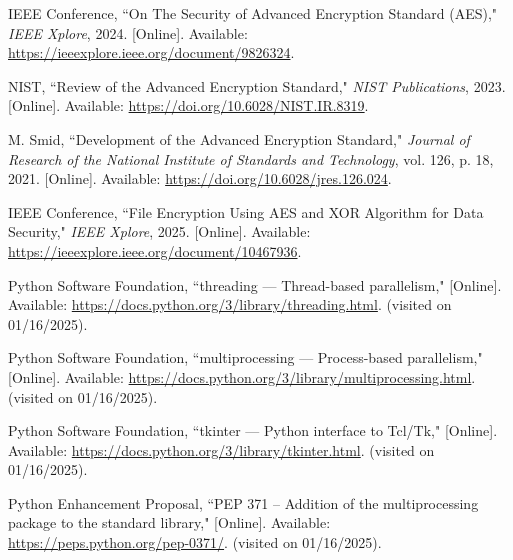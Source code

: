 \documentclass[../DoAn.tex]{subfiles}
\begin{document}
\cite{AES2024security} IEEE Conference, ``On The Security of Advanced Encryption Standard (AES)," \textit{IEEE Xplore}, 2024. [Online]. Available: \url{https://ieeexplore.ieee.org/document/9826324}.

\cite{AESReview} NIST, ``Review of the Advanced Encryption Standard," \textit{NIST Publications}, 2023. [Online]. Available: \url{https://doi.org/10.6028/NIST.IR.8319}.

\cite{AESDevelopment} M. Smid, ``Development of the Advanced Encryption Standard," \textit{Journal of Research of the National Institute of Standards and Technology}, vol. 126, p. 18, 2021. [Online]. Available: \url{https://doi.org/10.6028/jres.126.024}.

\cite{AESXOR2025} IEEE Conference, ``File Encryption Using AES and XOR Algorithm for Data Security," \textit{IEEE Xplore}, 2025. [Online]. Available: \url{https://ieeexplore.ieee.org/document/10467936}.

\cite{pythonThreading} Python Software Foundation, ``threading — Thread-based parallelism," [Online]. Available: \url{https://docs.python.org/3/library/threading.html}. (visited on 01/16/2025).

\cite{pythonMultiprocessing} Python Software Foundation, ``multiprocessing — Process-based parallelism," [Online]. Available: \url{https://docs.python.org/3/library/multiprocessing.html}. (visited on 01/16/2025).

\cite{pythonTkinter} Python Software Foundation, ``tkinter — Python interface to Tcl/Tk," [Online]. Available: \url{https://docs.python.org/3/library/tkinter.html}. (visited on 01/16/2025).

\cite{pep371} Python Enhancement Proposal, ``PEP 371 – Addition of the multiprocessing package to the standard library," [Online]. Available: \url{https://peps.python.org/pep-0371/}. (visited on 01/16/2025).
\end{document}
